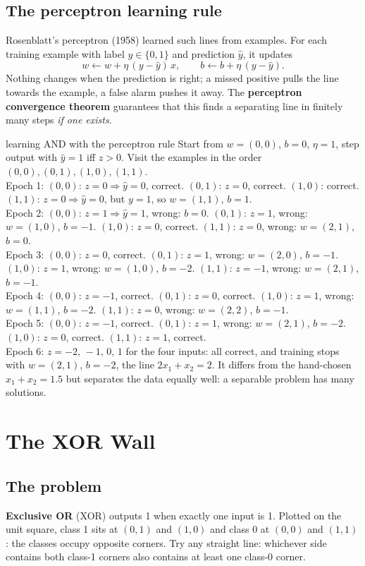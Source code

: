 \documentclass[11pt]{article}
\begin{document}
\subsection{The perceptron learning rule}
Rosenblatt's perceptron (1958) learned such lines from examples. For each training example with label $y\in\{0,1\}$ and prediction $\hat y$, it updates
\[w\leftarrow w+\eta\,(y-\hat y)\,x,\qquad b\leftarrow b+\eta\,(y-\hat y).\]
Nothing changes when the prediction is right; a missed positive pulls the line towards the example, a false alarm pushes it away. The \textbf{perceptron convergence theorem} guarantees that this finds a separating line in finitely many steps \emph{if one exists}.
\begin{example}{learning AND with the perceptron rule}
Start from $w=(0,0)$, $b=0$, $\eta=1$, step output with $\hat y=1$ iff $z>0$. Visit the examples in the order $(0,0),(0,1),(1,0),(1,1)$.\\
Epoch 1: $(0,0)$: $z=0\Rightarrow\hat y=0$, correct. $(0,1)$: $z=0$, correct. $(1,0)$: correct. $(1,1)$: $z=0\Rightarrow\hat y=0$, but $y=1$, so $w=(1,1)$, $b=1$.\\
Epoch 2: $(0,0)$: $z=1\Rightarrow\hat y=1$, wrong: $b=0$. $(0,1)$: $z=1$, wrong: $w=(1,0)$, $b=-1$. $(1,0)$: $z=0$, correct. $(1,1)$: $z=0$, wrong: $w=(2,1)$, $b=0$.\\
Epoch 3: $(0,0)$: $z=0$, correct. $(0,1)$: $z=1$, wrong: $w=(2,0)$, $b=-1$. $(1,0)$: $z=1$, wrong: $w=(1,0)$, $b=-2$. $(1,1)$: $z=-1$, wrong: $w=(2,1)$, $b=-1$.\\
Epoch 4: $(0,0)$: $z=-1$, correct. $(0,1)$: $z=0$, correct. $(1,0)$: $z=1$, wrong: $w=(1,1)$, $b=-2$. $(1,1)$: $z=0$, wrong: $w=(2,2)$, $b=-1$.\\
Epoch 5: $(0,0)$: $z=-1$, correct. $(0,1)$: $z=1$, wrong: $w=(2,1)$, $b=-2$. $(1,0)$: $z=0$, correct. $(1,1)$: $z=1$, correct.\\
Epoch 6: $z=-2,\,-1,\,0,\,1$ for the four inputs: all correct, and training stops with $w=(2,1)$, $b=-2$, the line $2x_1+x_2=2$. It differs from the hand-chosen $x_1+x_2=1.5$ but separates the data equally well: a separable problem has many solutions.
\end{example}

\section{The XOR Wall}\label{sec:xor}
\subsection{The problem}
\textbf{Exclusive OR} (XOR) outputs 1 when exactly one input is 1. Plotted on the unit square, class 1 sits at $(0,1)$ and $(1,0)$ and class 0 at $(0,0)$ and $(1,1)$: the classes occupy opposite corners. Try any straight line: whichever side contains both class-1 corners also contains at least one class-0 corner.
\end{document}
